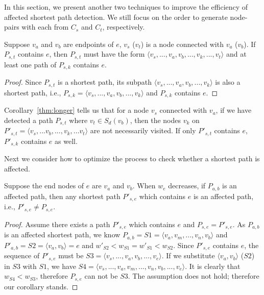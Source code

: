 In this section, we present another two techniques to improve the efficiency of affected shortest path detection. We still focus on the order to generate node-pairs with each from $C_s$ and $C_t$, respectively.

\begin{corollary}
\label{thm:longer}
Suppose $v_a$ and $v_b$ are endpoints of $e$, $v_s$ ($v_t$) is a node connected with $v_a$ ($v_b$). If $P_{s,t}$ contains $e$, then $P_{s,t}$ must have the form $\langle v_s,...,v_a,v_b,...,v_k,...,v_t\rangle $ and at least one path of $P_{s,k}$ contains $e$.
\end{corollary}

\begin{proof}
Since $P_{s,t}$ is a shortest path, its subpath $\langle v_s,...,v_a,v_b,...,v_k\rangle $ is also a shortest path, i.e., $P_{s,k}=\langle v_s,...,v_a,v_b,...,v_k\rangle$ and $P_{s,k}$ contains $e$.
\end{proof}

Corollary~\ref{thm:longer} tells us that for a node $v_s$ connected with $v_a$, if we have detected a path $P_{s,t}$ where $v_t\in S_{d}(v_b)$, then the nodes $v_k$ on $P'_{s,t}=\langle v_s,...v_b,...,v_k,...v_t\rangle$ are not necessarily visited. If only $P'_{s,t}$ contains $e$, $P'_{s,k}$ contains $e$ as well.

Next we consider how to optimize the process to check whether a shortest path is affected.
\begin{corollary}
\label{thm:check}
Suppose the end nodes of $e$ are $v_a$ and $v_b$. When $w_e$ decreases, if $P_{a,b}$ is an affected path, then any shortest path $P'_{s,e}$ which contains $e$ is an affected path, i.e., $P'_{s,e} \neq P_{s,e}$.
\end{corollary}


\begin{proof}
Assume there exists a path $P'_{s,e}$ which contains $e$ and $P_{s,e}=P'_{s,e}$.
As $P_{a,b}$ is an affected shortest path, we know $P_{a,b}=S1=\langle v_a,v_m,...,v_n,v_b\rangle$ and $P'_{a,b}=S2=\langle v_a,v_b\rangle=e$ and $w'_{S2}<w_{S1}=w'_{S1}<w_{S2}$.
Since $P'_{s,e}$ contains $e$, the sequence of $P'_{s,e}$ must be $S3=\langle v_s,...,v_a,v_b,...,v_e\rangle $. If we substitute $\langle v_a,v_b\rangle$ ($S2$) in $S3$ with $S1$, we have $S4=\langle v_s,...,v_a,v_m,...,v_n,v_b,...,v_e\rangle$. It is clearly that $w_{S4}<w_{S3}$, therefore $P_{s,e}$ can not be $S3$. The assumption does not hold; therefore our corollary stands.
\end{proof}

